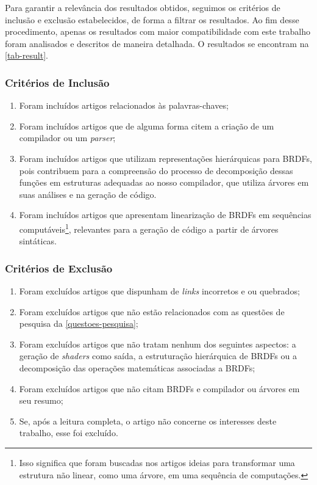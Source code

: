 Para garantir a relevância dos resultados obtidos, seguimos os critérios de inclusão e exclusão estabelecidos, de forma a filtrar os resultados. Ao fim desse procedimento, apenas os resultados com maior compatibilidade com este trabalho foram analisados e descritos de maneira detalhada. O resultados se encontram na \autoref{tab-result}.


\subsubsection{Critérios de Inclusão}


\begin{enumerate}
  \item Foram incluídos artigos relacionados às palavras-chaves;

  \item Foram incluídos artigos que de alguma forma citem a criação de um compilador ou um \textit{parser};

  \item Foram incluídos artigos que utilizam representações hierárquicas para BRDFs, pois contribuem para a compreensão do processo de decomposição dessas funções em estruturas adequadas ao nosso compilador, que utiliza árvores em suas análises e na geração de código.

  \item Foram incluídos artigos que apresentam linearização de BRDFs em sequências computáveis\footnote{Isso significa que foram buscadas nos artigos ideias para transformar uma estrutura não linear, como uma árvore, em uma sequência de computações.}, relevantes para a geração de código a partir de árvores sintáticas.
\end{enumerate}


\subsubsection{Critérios de Exclusão}


\begin{enumerate}
  \item Foram excluídos artigos que dispunham de \textit{links} incorretos e ou quebrados;
  \item Foram excluídos artigos que não estão relacionados com as questões de pesquisa da \autoref{questoes-pesquisa};
  \item Foram excluídos artigos que não tratam nenhum dos seguintes aspectos: a geração de \textit{shaders} como saída, a estruturação hierárquica de BRDFs ou a decomposição das operações matemáticas associadas a BRDFs;

  \item Foram excluídos artigos que não citam BRDFs e compilador ou árvores em seu resumo;
  \item Se, após a leitura completa, o artigo não concerne os interesses deste trabalho, esse foi excluído.
\end{enumerate}



